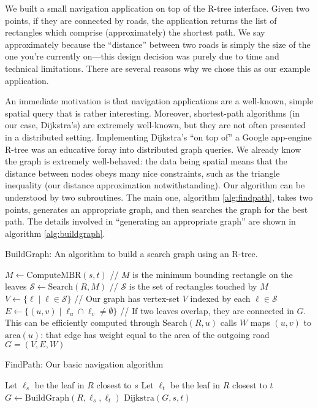 We built a small navigation application on top of the R-tree interface.
Given two points, if they are connected by roads, the application returns the list of rectangles which comprise (approximately) the shortest path.
We say approximately because the ``distance'' between two roads is simply the size of the one you're currently on---this design decision was purely due to time and technical limitations.
There are several reasons why we chose this as our example application.


An immediate motivation is that navigation applications are a well-known, simple spatial query that is rather interesting.
Moreover, shortest-path algorithms (in our case, Dijkstra's) are extremely well-known, but they are not often presented in a distributed setting.
Implementing Dijkstra's ``on top of'' a Google app-engine R-tree was an educative foray into distributed graph queries.
We already know the graph is extremely well-behaved: the data being spatial means that the distance between nodes obeys many nice constraints, such as the triangle inequality (our distance approximation notwithstanding).
Our algorithm can be understood by two subroutines.
The main one, algorithm \ref{alg:findpath}, takes two points, generates an appropriate graph, and then searches the graph for the best path.
The details involved in ``generating an appropriate graph'' are shown in algorithm \ref{alg:buildgraph}.

\begin{algorithm}
\caption{BuildGraph: An algorithm to build a search graph using an R-tree.}\label{alg:buildgraph}
$M\longleftarrow\text{ComputeMBR}(s,t)$ // $M$ is the minimum bounding rectangle on the leaves\;
$\mathcal S\longleftarrow\text{Search}(R,M)$ // $\mathcal S$ is the set of rectangles touched by $M$\;
$V\longleftarrow\{\ell\mid\ell\in\mathcal S\}$ // Our graph has vertex-set $V$ indexed by each $\ell\in\mathcal S$\;
$E\longleftarrow\{(u,v)\mid \ell_u\cap\ell_v\neq\emptyset\}$ // If two leaves overlap, they are connected in $G$. This can be efficiently computed through $\text{Search}(R,u)$ calls\;
$W$ maps $(u,v)$ to $\text{area}(u)$: that edge has weight equal to the area of the outgoing road\;
\Return $G=(V,E,W)$\;
\end{algorithm}

\begin{algorithm}
\caption{FindPath: Our basic navigation algorithm}\label{alg:findpath}
Let $\ell_s$ be the leaf in $R$ closest to $s$\;
Let $\ell_t$ be the leaf in $R$ closest to $t$\;
$G\longleftarrow\text{BuildGraph}(R,\ell_s,\ell_t)$\;
\Return $\text{Dijkstra}(G,s,t)$\;
\end{algorithm}

